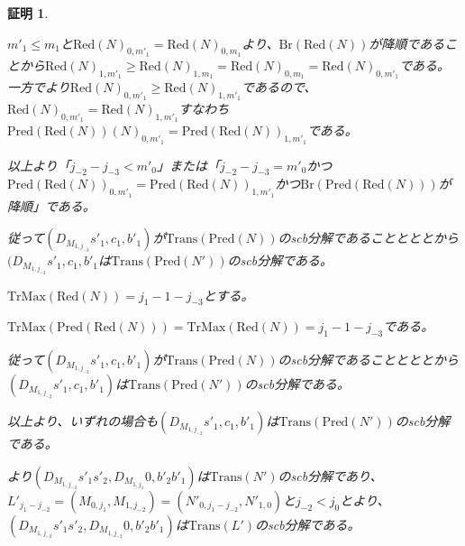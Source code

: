 \documentclass[dvipdfmx,uplatex]{jsarticle}
\theoremstyle{customnonumberbreakfortheorem}
\theoremstyle{customnonumberbreakforproof}
\newtheorem{hideableproof}{証明}
\begin{document}
\begin{hideableproof}
\begin{indented}
\begin{indented}
\begin{indented}
				\item \(m'_1 \leq m_1\)と\(\textrm{Red}(N)_{0,m'_1} = \textrm{Red}(N)_{0,m_1}\)より、\(\textrm{Br}(\textrm{Red}(N))\)が降順であることから\(\textrm{Red}(N)_{1,m'_1} \geq \textrm{Red}(N)_{1,m_1} = \textrm{Red}(N)_{0,m_1} = \textrm{Red}(N)_{0,m'_1}\)である。一方でより\(\textrm{Red}(N)_{0,m'_1} \geq \textrm{Red}(N)_{1,m'_1}\)であるので、\(\textrm{Red}(N)_{0,m'_1} = \textrm{Red}(N)_{1,m'_1}\)すなわち\(\textrm{Pred}(\textrm{Red}(N))(N)_{0,m'_1} = \textrm{Pred}(\textrm{Red}(N))_{1,m'_1}\)である。
			\end{indented}
			\item 以上より「\(j_{-2}-j_{-3} < m'_0\)」または「\(j_{-2}-j_{-3} = m'_0\)かつ\(\textrm{Pred}(\textrm{Red}(N))_{0,m'_1} = \textrm{Pred}(\textrm{Red}(N))_{1,m'_1}\)かつ\(\textrm{Br}(\textrm{Pred}(\textrm{Red}(N)))\)が降順」である。
			\item 従って\((D_{M_{1,j_{-3}}} s'_1,c_1,b'_1)\)が\(\textrm{Trans}(\textrm{Pred}(N))\)のscb分解であることとととから\((D_{M_{1,j_{-2}}} s'_1,c_1,b'_1\)は\(\textrm{Trans}(\textrm{Pred}(N'))\)のscb分解である。
		\end{indented}
		\item
		\item \(\textrm{TrMax}(\textrm{Red}(N)) = j_1-1-j_{-3}\)とする。
		\begin{indented}
			\item \(\textrm{TrMax}(\textrm{Pred}(\textrm{Red}(N))) = \textrm{TrMax}(\textrm{Red}(N)) = j_1-1-j_{-3}\)である。
			\item 従って\((D_{M_{1,j_{-3}}} s'_1,c_1,b'_1)\)が\(\textrm{Trans}(\textrm{Pred}(N))\)のscb分解であることとととから\((D_{M_{1,j_{-2}}} s'_1,c_1,b'_1)\)は\(\textrm{Trans}(\textrm{Pred}(N'))\)のscb分解である。
		\end{indented}
		\item 以上より、いずれの場合も\((D_{M_{1,j_{-2}}} s'_1,c_1,b'_1)\)は\(\textrm{Trans}(\textrm{Pred}(N'))\)のscb分解である。
		\item {}より\((D_{M_{1,j_{-2}}} s'_1 s'_2,D_{M_{1,j_1}} 0,b'_2 b'_1)\)は\(\textrm{Trans}(N')\)のscb分解であり、\(L'_{j_1-j_{-2}} = (M_{0,j_1},M_{1,j_{-2}}) = (N'_{0,j_1-j_{-2}},N'_{1,0})\)と\(j_{-2} < j_0\)とより、\((D_{M_{1,j_{-2}}} s'_1 s'_2,D_{M_{1,j_{-2}}} 0,b'_2 b'_1)\)は\(\textrm{Trans}(L')\)のscb分解である。

\end{indented}
\end{hideableproof}
\end{document}

